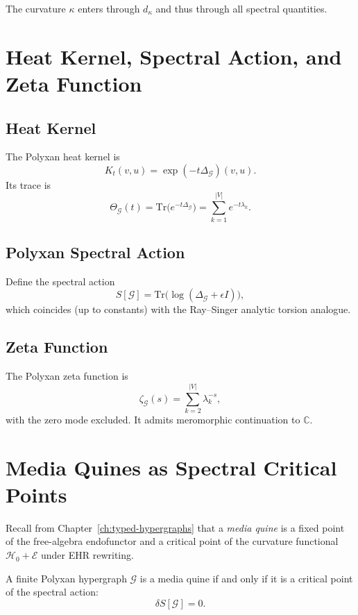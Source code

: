 The curvature $\kappa$ enters through $d_\kappa$ and thus through all spectral quantities.

\section{Heat Kernel, Spectral Action, and Zeta Function}

\subsection{Heat Kernel}

The Polyxan heat kernel is
\[
K_t(v,u) = \exp(-t\Delta_{\mathcal{G}})(v,u).
\]
Its trace is
\[
\Theta_{\mathcal{G}}(t) = \mathrm{Tr}\big(e^{-t\Delta_{\mathcal{G}}}\big)
= \sum_{k=1}^{|V|} e^{-t\lambda_k}.
\]

\subsection{Polyxan Spectral Action}

Define the spectral action
\[
S[\mathcal{G}]
= \mathrm{Tr}\big(\log(\Delta_{\mathcal{G}} + \epsilon I)\big),
\]
which coincides (up to constants) with the Ray–Singer analytic torsion analogue.

\subsection{Zeta Function}

The Polyxan zeta function is
\[
\zeta_{\mathcal{G}}(s)
= \sum_{k=2}^{|V|} \lambda_k^{-s},
\]
with the zero mode excluded.  
It admits meromorphic continuation to $\mathbb{C}$.

\section{Media Quines as Spectral Critical Points}

Recall from Chapter~\ref{ch:typed-hypergraphs} that a \emph{media quine}
is a fixed point of the free-algebra endofunctor and a critical point of the 
curvature functional $\mathcal{H}_0 + \mathcal{E}$ under EHR rewriting.

\begin{theorem}
\label{thm:spectral-quine}
A finite Polyxan hypergraph $\mathcal{G}$ is a media quine if and only if
it is a critical point of the spectral action:
\[
\delta S[\mathcal{G}] = 0.
\]
\end{theorem}

